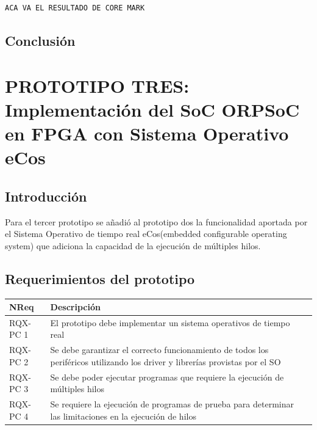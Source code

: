 \begin{lstlisting}[frame=single,caption={Salida de la terminal serie de los resultados de la ejecución del benchmark},label={lst:rescrm}]
 ACA VA EL RESULTADO DE CORE MARK
\end{lstlisting}

		\subsection{Conclusión}

\newpage

	\section{PROTOTIPO TRES: Implementación del SoC ORPSoC en FPGA con Sistema Operativo eCos}
		\subsection{Introducción}

		Para el tercer prototipo se añadió al prototipo dos la funcionalidad aportada por el Sistema Operativo de tiempo real eCos(embedded configurable operating system) que adiciona la capacidad de la ejecución de múltiples hilos. 


		\subsection{Requerimientos del prototipo}

		\begin{table}[h!]
		\centering		
		\begin{tabular}{ p{2.5cm} p{8cm} p{3cm} }
		\hline 
		\rowcolor[gray]{0.8} N\textordmasculine Req & Descripción\\
		\hline 
		RQX-PC 1 & El prototipo debe implementar un sistema operativos de tiempo real\\ 
		\hline 
		RQX-PC 2 & Se debe garantizar el correcto funcionamiento de todos los periféricos utilizando los driver y librerías provistas por el SO \\ 
		\hline 
		RQX-PC 3 & Se debe poder ejecutar programas que requiere la ejecución de múltiples hilos  \\ 
		\hline
		RQX-PC 4 & Se requiere la ejecución de programas de prueba para determinar las limitaciones en la ejecución de hilos \\ 
		\hline		
		\end{tabular}
		\end{table}
		

